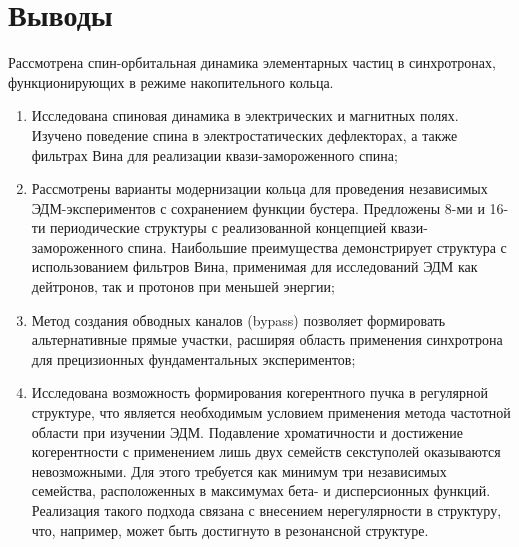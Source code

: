 	\section*{Выводы}
\par Рассмотрена спин-орбитальная динамика элементарных частиц в синхротронах, функционирующих в режиме накопительного кольца. 

\begin{enumerate}

\item Исследована спиновая динамика в электрических и магнитных полях. Изучено поведение спина в электростатических дефлекторах, а также фильтрах Вина для реализации квази-замороженного спина;

\item Рассмотрены варианты модернизации кольца для проведения независимых ЭДМ-экспериментов с сохранением функции бустера. Предложены 8-ми и 16-ти периодические структуры с реализованной концепцией квази-замороженного спина. Наибольшие преимущества демонстрирует структура с использованием фильтров Вина, применимая для исследований ЭДМ как дейтронов, так и протонов при меньшей энергии;

\item Метод создания обводных каналов (bypass) позволяет формировать альтернативные прямые участки, расширяя область применения синхротрона для прецизионных фундаментальных экспериментов; 

\item Исследована возможность формирования когерентного пучка в регулярной структуре, что является необходимым условием применения метода частотной области при изучении ЭДМ. Подавление хроматичности и достижение когерентности с применением лишь двух семейств секступолей оказываются невозможными. Для этого требуется как минимум три независимых семейства, расположенных в максимумах бета- и дисперсионных функций. Реализация такого подхода связана с внесением нерегулярности в структуру, что, например, может быть достигнуто в резонансной структуре.

\end{enumerate}

\FloatBarrier
